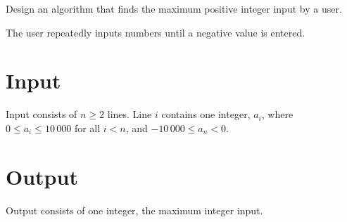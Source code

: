 
Design an algorithm that finds the maximum positive integer input by a user.

The user repeatedly inputs numbers until a negative value is entered.

\section*{Input}
Input consists of $n \ge 2$ lines.
Line $i$ contains one integer, $a_i$,
where $0 \le a_i \le 10\,000$ for all $i < n$,
and $-10\,000 \le a_n < 0$.

\section*{Output}
Output consists of one integer, the maximum integer input.
